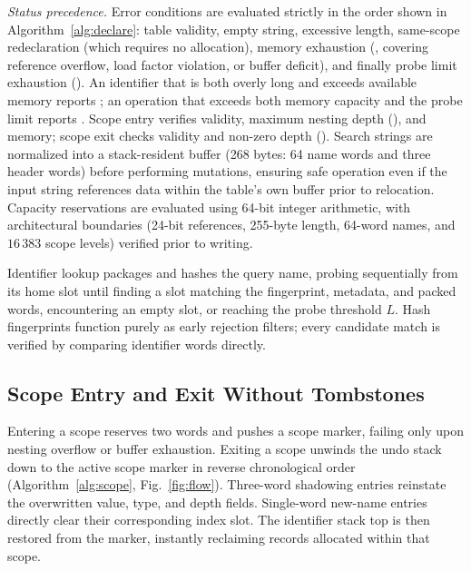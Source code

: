\emph{Status precedence.} Error conditions are evaluated strictly in the order shown in Algorithm~\ref{alg:declare}: table validity, empty string, excessive length, same-scope redeclaration (which requires no allocation), memory exhaustion (, covering reference overflow, load factor violation, or buffer deficit), and finally probe limit exhaustion (). An identifier that is both overly long and exceeds available memory reports ; an operation that exceeds both memory capacity and the probe limit reports . Scope entry verifies validity, maximum nesting depth (), and memory; scope exit checks validity and non-zero depth (). Search strings are normalized into a stack-resident buffer (268 bytes: 64 name words and three header words) before performing mutations, ensuring safe operation even if the input string references data within the table's own buffer prior to relocation. Capacity reservations are evaluated using 64-bit integer arithmetic, with architectural boundaries (24-bit references, 255-byte length, 64-word names, and $16\,383$ scope levels) verified prior to writing.

Identifier lookup packages and hashes the query name, probing sequentially from its home slot until finding a slot matching the fingerprint, metadata, and packed words, encountering an empty slot, or reaching the probe threshold $L$. Hash fingerprints function purely as early rejection filters; every candidate match is verified by comparing identifier words directly.

\subsection{Scope Entry and Exit Without Tombstones}
\label{sec:exit}
Entering a scope reserves two words and pushes a scope marker, failing only upon nesting overflow or buffer exhaustion. Exiting a scope unwinds the undo stack down to the active scope marker in reverse chronological order (Algorithm~\ref{alg:scope}, Fig.~\ref{fig:flow}). Three-word shadowing entries reinstate the overwritten value, type, and depth fields. Single-word new-name entries directly clear their corresponding index slot. The identifier stack top is then restored from the marker, instantly reclaiming records allocated within that scope.

